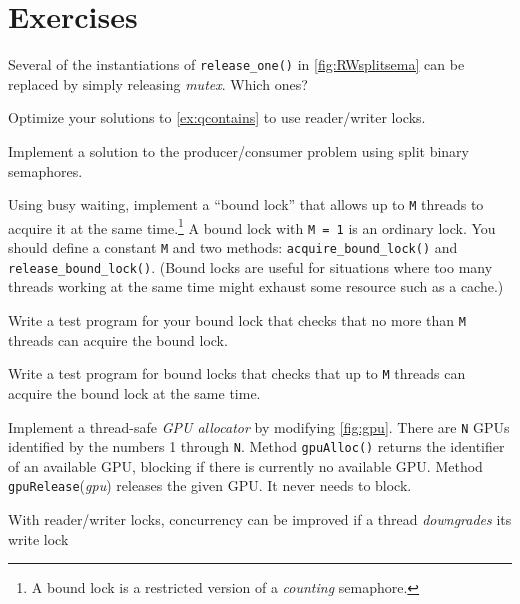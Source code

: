 \documentclass{report}
\begin{document}
\section*{Exercises}
\begin{problems}
\item Several of the instantiations of \texttt{release\_one()} in
\autoref{fig:RWsplitsema} can be replaced by simply releasing \textit{mutex}.
Which ones?
\item Optimize your solutions to \autoref{ex:qcontains} to use reader/writer locks.
\item \label{ex:bbsbs} Implement a solution to the producer/consumer problem
using split binary semaphores.
\item \label{ex:boundlock} Using busy waiting, implement a ``bound lock'' that allows
up to \texttt{M} threads to acquire it at the same time.\footnote{A bound lock is a restricted version of a \emph{counting} semaphore.}
A bound lock
with \texttt{M = 1} is an ordinary lock.
You should define a constant \texttt{M} and two methods:
\texttt{acquire\_bound\_lock()}
and \texttt{release\_bound\_lock()}.
(Bound locks are useful for situations where too many threads working
at the same time might exhaust some resource such as a cache.)
\item Write a test program for your bound lock
that checks that no more than \texttt{M} threads can acquire the
bound lock.
\item Write a test program for bound locks
that checks that up to \texttt{M} threads
can acquire the bound lock at the same time.
\item \label{ex:gpu} Implement a thread-safe \emph{GPU allocator} by modifying
\autoref{fig:gpu}.
There are \texttt{N} GPUs identified by the numbers
1 through \texttt{N}.  Method \texttt{gpuAlloc()} returns the identifier
of an available GPU, blocking if there is currently no available GPU.
Method \texttt{gpuRelease}(\textit{gpu}) releases the given GPU.  It never needs
to block.
\item With reader/writer locks,
concurrency can be improved if a thread \emph{downgrades} its write lock

\end{problems}
\end{document}
